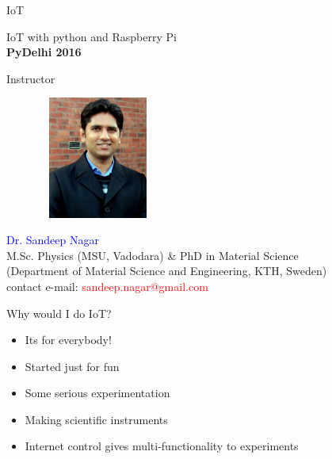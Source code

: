 \begin{frame}{IoT}

\centering
\Large{IoT with python and Raspberry Pi}\\
\textbf{PyDelhi 2016}
	
\end{frame}

\begin{frame}{Instructor}
	\begin{figure}
		\centering
		\includegraphics[width=4cm,height=4cm,keepaspectratio]{me}
	\end{figure}
	
	\centering
	\textcolor{blue}{Dr. Sandeep Nagar} \\
	M.Sc. Physics (MSU, Vadodara) \& PhD in Material Science \\ (Department of Material Science and Engineering, KTH, Sweden) \\
	contact e-mail: \textcolor{red}{sandeep.nagar@gmail.com}
\end{frame}

\begin{frame}{Why would I do IoT?}
	\begin{itemize}
		\item Its for everybody!
		\item Started just for fun
		\item Some serious experimentation
		\item Making scientific instruments
		\item Internet control gives multi-functionality to experiments
	\end{itemize}
\end{frame}

